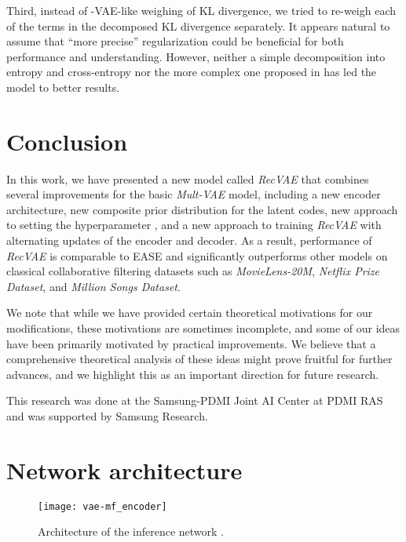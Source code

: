 \documentclass[sigconf,authorversion]{acmart}
\begin{document}
Third, instead of -VAE-like weighing of KL divergence, we tried to re-weigh each of the terms in the decomposed KL divergence separately. It appears natural to assume that ``more precise'' regularization could be beneficial for both performance and understanding. However, neither a simple decomposition into entropy and cross-entropy nor the more complex one proposed in \cite{chen2018isolating} has led the model to better results.

\section{Conclusion}\label{sec:conclusion}

In this work, we have presented a new model called \emph{RecVAE} that combines several improvements for the basic \emph{Mult-VAE} model, including a new encoder architecture, new composite prior distribution for the latent codes, new approach to setting the hyperparameter , and a new approach to training \emph{RecVAE} with alternating updates of the encoder and decoder. As a result, performance of \emph{RecVAE} is comparable to EASE and significantly outperforms other models on classical collaborative filtering datasets such as \emph{MovieLens-20M}, \emph{Netflix Prize Dataset}, and \emph{Million Songs Dataset}.

We note that while we have provided certain theoretical motivations for our modifications, these motivations are sometimes incomplete, and some of our ideas have been primarily motivated by practical improvements. We believe that a comprehensive theoretical analysis of these ideas might prove fruitful for further advances, and we highlight this as an important direction for future research.

\FloatBarrier

\begin{acks}
This research was done at the Samsung-PDMI Joint AI Center at PDMI RAS and was supported by Samsung Research.
\end{acks}




\appendix

\section{Network architecture}

\begin{figure}[h]
  \centering
  \texttt{[image: vae-mf\_encoder]}
  \caption{Architecture of the inference network .}
  \label{fig:encoder}
\end{figure}
\end{document}
